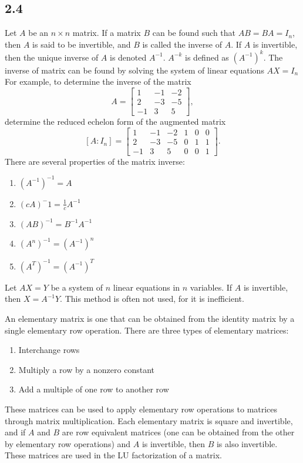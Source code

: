 \documentclass{article}
\begin{document}
    \subsection*{2.4}
    Let $A$ be an $n \times n$ matrix. If a matrix $B$ can be found such that $AB = BA = I_n$, 
    then $A$ is said to be invertible, and $B$ is called the inverse of $A$.
    If $A$ is invertible, then the unique inverse of $A$ is denoted $A^{-1}$.
    $A^{-k}$ is defined as $(A^{-1})^k$. 
    The inverse of matrix can be found by solving the system of linear equations $AX = I_n$
    For example, to determine the inverse of the matrix
    \[
    A = 
    \begin{bmatrix}
        1 & -1 & -2 \\
        2 & -3 & -5 \\
        -1 & 3 & 5
    \end{bmatrix},
    \]
    determine the reduced echelon form of the augmented matrix
    \[
    [A:I_n] =
    \begin{bmatrix}
         1 & -1 & -2 & 1 & 0 & 0 \\
        2 & -3 & -5 & 0 & 1 & 1\\
        -1 & 3 & 5 & 0 & 0 & 1
    \end{bmatrix}.
    \]
    There are several properties of the matrix inverse:
    \begin{enumerate}
        \item $(A^{-1})^{-1} = A$
        \item $(cA)^-1 = \frac{1}{c}A^{-1}$
        \item $(AB)^{-1} = B^{-1}A^{-1}$
        \item $(A^n)^{-1} = (A^{-1})^n$
        \item $(A^T)^{-1} = (A^{-1})^T$
    \end{enumerate}

    Let $AX=Y$ be a system of $n$ linear equations in $n$ variables. 
    If $A$ is invertible, then $X = A^{-1}Y$. 
    This method is often not used, for it is inefficient. 

    An elementary matrix is one that can be obtained from the identity matrix by a single elementary row operation.
    There are three types of elementary matrices:
    \begin{enumerate}
        \item Interchange rows
        \item Multiply a row by a nonzero constant
        \item Add a multiple of one row to another row
    \end{enumerate}
    These matrices can be used to apply elementary row operations to matrices through matrix multiplication. 
    Each elementary matrix is square and invertible,
    and if $A$ and $B$ are row equivalent matrices (one can be obtained from the other by elementary row operations) 
    and $A$ is invertible, then $B$ is also invertible.
    These matrices are used in the LU factorization of a matrix.
\end{document}
